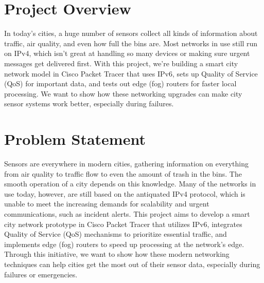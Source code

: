 \documentclass[12pt,a4paper]{article}
\begin{document}


\section*{Project Overview}
In today’s cities, a huge number of sensors collect all kinds of information about traffic, air quality, and even how full the bins are. Most networks in use still run on IPv4, which isn’t great at handling so many devices or making sure urgent messages get delivered first. With this project, we’re building a smart city network model in Cisco Packet Tracer that uses IPv6, sets up Quality of Service (QoS) for important data, and tests out edge (fog) routers for faster local processing. We want to show how these networking upgrades can make city sensor systems work better, especially during failures.

\vspace{1em}

\section*{Problem Statement}
Sensors are everywhere in modern cities, gathering information on everything from air quality to traffic flow to even the amount of trash in the bins. The smooth operation of a city depends on this knowledge. Many of the networks in use today, however, are still based on the antiquated IPv4 protocol, which is unable to meet the increasing demands for scalability and urgent communications, such as incident alerts. This project aims to develop a smart city network prototype in Cisco Packet Tracer that utilizes IPv6, integrates Quality of Service (QoS) mechanisms to prioritize essential traffic, and implements edge (fog) routers to speed up processing at the network's edge. Through this initiative, we want to show how these modern networking techniques can help cities get the most out of their sensor data, especially during failures or emergencies.

\vspace{1em}
\end{document}
